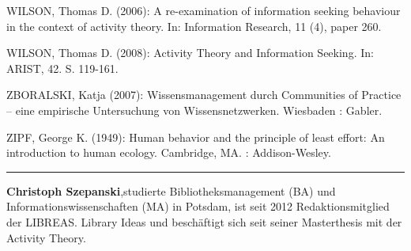 \documentclass[a4paper,
fontsize=11pt,
oneside,
numbers=noperiodatend,
parskip=half-,
bibliography=totoc,
final
]{scrartcl}
\begin{document}
WILSON, Thomas D. (2006): A re-examination of information seeking
behaviour in the context of activity theory. In: Information Research,
11 (4), paper 260.

WILSON, Thomas D. (2008): Activity Theory and Information Seeking. In:
ARIST, 42. S. 119-161.

ZBORALSKI, Katja (2007): Wissensmanagement durch Communities of Practice
-- eine empirische Untersuchung von Wissensnetzwerken. Wiesbaden :
Gabler.

ZIPF, George K. (1949): Human behavior and the principle of least
effort: An introduction to human ecology. Cambridge, MA. :
Addison-Wesley.

\begin{center}\rule{0.5\linewidth}{\linethickness}\end{center}

\textbf{Christoph Szepanski},studierte Bibliotheksmanagement (BA) und
Informationswissenschaften (MA) in Potsdam, ist seit 2012
Redaktionsmitglied der LIBREAS. Library Ideas und beschäftigt sich seit
seiner Masterthesis mit der Activity Theory.
\end{document}
